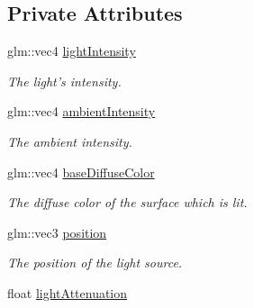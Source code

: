 \subsection*{Private Attributes}
\begin{DoxyCompactItemize}
\item 
\hypertarget{class_sun_light_a1fe5f1436fda2baea246524224a907b3}{glm\-::vec4 \hyperlink{class_sun_light_a1fe5f1436fda2baea246524224a907b3}{light\-Intensity}}\label{class_sun_light_a1fe5f1436fda2baea246524224a907b3}

\begin{DoxyCompactList}\small\item\em The light's intensity. \end{DoxyCompactList}\item 
\hypertarget{class_sun_light_ad3284638146c2cea20545a217b87dfc1}{glm\-::vec4 \hyperlink{class_sun_light_ad3284638146c2cea20545a217b87dfc1}{ambient\-Intensity}}\label{class_sun_light_ad3284638146c2cea20545a217b87dfc1}

\begin{DoxyCompactList}\small\item\em The ambient intensity. \end{DoxyCompactList}\item 
\hypertarget{class_sun_light_a091ee9920e44f4243acbcf13525c08c1}{glm\-::vec4 \hyperlink{class_sun_light_a091ee9920e44f4243acbcf13525c08c1}{base\-Diffuse\-Color}}\label{class_sun_light_a091ee9920e44f4243acbcf13525c08c1}

\begin{DoxyCompactList}\small\item\em The diffuse color of the surface which is lit. \end{DoxyCompactList}\item 
\hypertarget{class_sun_light_a69194d86c6aaf89e2a98f6e0672c7660}{glm\-::vec3 \hyperlink{class_sun_light_a69194d86c6aaf89e2a98f6e0672c7660}{position}}\label{class_sun_light_a69194d86c6aaf89e2a98f6e0672c7660}

\begin{DoxyCompactList}\small\item\em The position of the light source. \end{DoxyCompactList}\item 
\hypertarget{class_sun_light_ae19dacac63ebedb1ffe586b145d9c06e}{float \hyperlink{class_sun_light_ae19dacac63ebedb1ffe586b145d9c06e}{light\-Attenuation}}\label{class_sun_light_ae19dacac63ebedb1ffe586b145d9c06e}


\end{DoxyCompactItemize}
